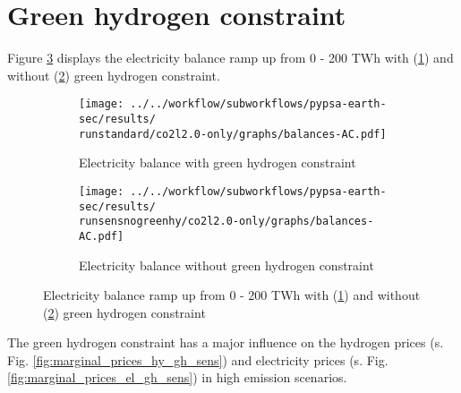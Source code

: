 \section{Green hydrogen constraint}
\label{subsec:gh_constraint_effects}
Figure \ref{fig:barplotscons} displays the electricity balance ramp up from 0 - 200 TWh with (\ref{fig:balances_AC_monthlymatch}) and without (\ref{fig:balances_AC_nogreen}) green hydrogen constraint.


\begin{figure}[h!]
    \centering
    \begin{subfigure}[b]{\linewidth}
        \centering
        \texttt{[image: ../../workflow/subworkflows/pypsa-earth-sec/results/\\runstandard/co2l2.0-only/graphs/balances-AC.pdf]}
        \caption{Electricity balance with green hydrogen constraint}
        \label{fig:balances_AC_monthlymatch}
    \end{subfigure}
    
    \vspace{0.5cm} %
    
    \begin{subfigure}[b]{\linewidth}
        \centering
        \texttt{[image: ../../workflow/subworkflows/pypsa-earth-sec/results/\\runsensnogreenhy/co2l2.0-only/graphs/balances-AC.pdf]}
        \caption{Electricity balance without green hydrogen constraint}
        \label{fig:balances_AC_nogreen}
    \end{subfigure}
    
    \caption{Electricity balance ramp up from 0 - 200 TWh with (\ref{fig:balances_AC_monthlymatch}) and without (\ref{fig:balances_AC_nogreen}) green hydrogen constraint}
    \label{fig:barplotscons}
\end{figure}

The green hydrogen constraint has a major influence on the hydrogen prices (s. Fig. \ref{fig:marginal_prices_hy_gh_sens}) and electricity prices (s. Fig. \ref{fig:marginal_prices_el_gh_sens}) in high emission scenarios.


